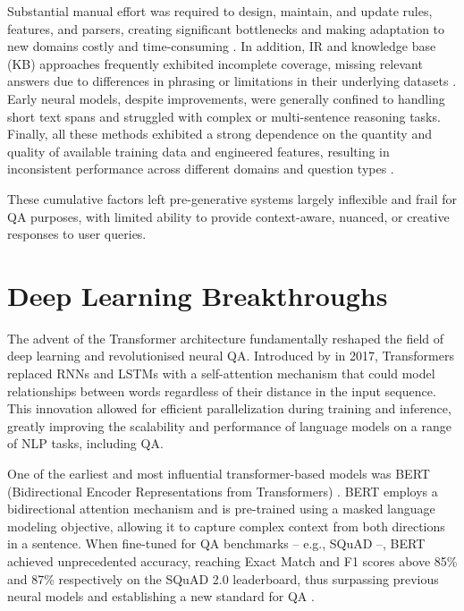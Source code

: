 \begin{spacing}{1.5}
Substantial manual effort was required to design, maintain, and update rules, features, and parsers, creating significant bottlenecks and making adaptation to new domains costly and time-consuming \citep{alanazi_question_2021}. In addition, IR and knowledge base (KB) approaches frequently exhibited incomplete coverage, missing relevant answers due to differences in phrasing or limitations in their underlying datasets \citep{diefenbach_core_2018}. Early neural models, despite improvements, were generally confined to handling short text spans and struggled with complex or multi-sentence reasoning tasks. Finally, all these methods exhibited a strong dependence on the quantity and quality of available training data and engineered features, resulting in inconsistent performance across different domains and question types \citep{liu_challenges_2022,alanazi_question_2021,alqifari_question_2019,diefenbach_core_2018,hirschman_natural_2001}.

These cumulative factors left pre-generative systems largely inflexible and frail for QA purposes, with limited ability to provide context-aware, nuanced, or creative responses to user queries.

\section{Deep Learning Breakthroughs}
The advent of the Transformer architecture fundamentally reshaped the field of deep learning and revolutionised neural QA. Introduced by \citeauthor{vaswani_attention_2017} in 2017, Transformers replaced RNNs and LSTMs with a self-attention mechanism that could model relationships between words regardless of their distance in the input sequence. This innovation allowed for efficient parallelization during training and inference, greatly improving the scalability and performance of language models on a range of NLP tasks, including QA.

One of the earliest and most influential transformer-based models was BERT (Bidirectional Encoder Representations from Transformers) \citep{devlin_bert_2019}. BERT employs a bidirectional attention mechanism and is pre-trained using a masked language modeling objective, allowing it to capture complex context from both directions in a sentence. When fine-tuned for QA benchmarks -- e.g., SQuAD --, BERT achieved unprecedented accuracy, reaching Exact Match and F1 scores above 85\% and 87\% respectively on the SQuAD 2.0 leaderboard, thus surpassing previous neural models and establishing a new standard for QA \citep{li_death_2024}.


\end{spacing}
